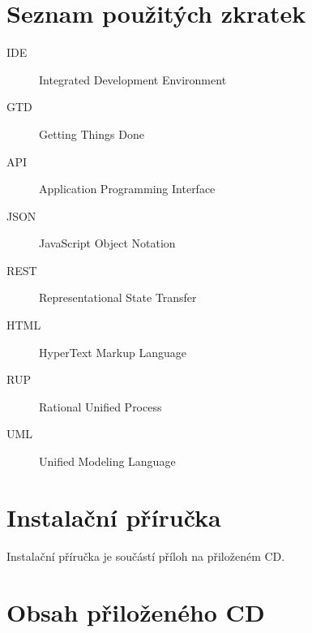 \documentclass[11pt,twoside,a4paper]{book}
\begin{document}
\chapter{Seznam použitých zkratek}

\begin{description}
\item[IDE] Integrated Development Environment
\item[GTD] Getting Things Done
\item[API] Application Programming Interface
\item[JSON] JavaScript Object Notation
\item[REST] Representational State Transfer
\item[HTML] HyperText Markup Language
\item[RUP] Rational Unified Process
\item[UML] Unified Modeling Language
\end{description}

\chapter{Instalační příručka}
Instalační příručka je součástí příloh na přiloženém CD.

\chapter{Obsah přiloženého CD}
\end{document}

